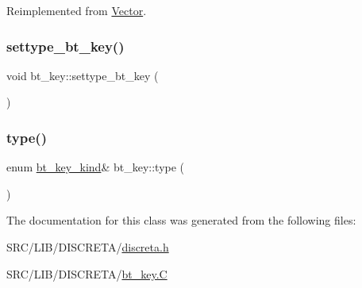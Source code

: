 Reimplemented from \mbox{\hyperlink{class_vector_a20550e70d02cbe484032c7f6b0833a0f}{Vector}}.

\mbox{\label{classbt__key_a352bb10beb7c789d8d29373035824800}} 
\subsubsection{\texorpdfstring{settype\+\_\+bt\+\_\+key()}{settype\_bt\_key()}}
{\footnotesize\ttfamily void bt\+\_\+key\+::settype\+\_\+bt\+\_\+key (\begin{DoxyParamCaption}{ }\end{DoxyParamCaption})}

\mbox{\label{classbt__key_ae788a415a20f75fe7160408a055bb33f}} 
\subsubsection{\texorpdfstring{type()}{type()}}
{\footnotesize\ttfamily enum \mbox{\hyperlink{discreta_8h_ac90b3b8c242d6128eb9985cfb7f77053}{bt\+\_\+key\+\_\+kind}}\& bt\+\_\+key\+::type (\begin{DoxyParamCaption}{ }\end{DoxyParamCaption})\hspace{0.3cm}{\ttfamily [inline]}}



The documentation for this class was generated from the following files\+:\begin{DoxyCompactItemize}
\item 
S\+R\+C/\+L\+I\+B/\+D\+I\+S\+C\+R\+E\+T\+A/\mbox{\hyperlink{discreta_8h}{discreta.\+h}}\item 
S\+R\+C/\+L\+I\+B/\+D\+I\+S\+C\+R\+E\+T\+A/\mbox{\hyperlink{bt__key_8_c}{bt\+\_\+key.\+C}}\end{DoxyCompactItemize}
